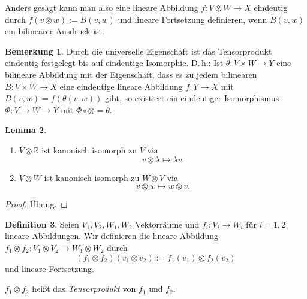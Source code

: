 \documentclass[a4paper]{scrreprt}
\numberwithin{equation}{chapter}
\newcommand{\R}{\mathbb{R}}
\theoremstyle{definition}
\newtheorem{defn}{Definition}[section]
\newtheorem{lemma}[defn]{Lemma}
\newtheorem{bem}[defn]{Bemerkung}
\newcommand{\bewUeb}{\begin{proof}Übung.\end{proof}}
\begin{document}
Anders gesagt kann man also eine lineare Abbildung $f\colon V\otimes W\to X$ eindeutig durch $f(v\otimes w) := B(v,w)$ und lineare Fortsetzung definieren, wenn $B(v,w)$ ein bilinearer Ausdruck ist.
\begin{bem}
	Durch die universelle Eigenschaft ist das Tensorprodukt eindeutig festgelegt bis auf eindeutige Isomorphie. D.\,h.: Ist $\theta\colon V\times W\to Y$ eine bilineare Abbildung mit der Eigenschaft, dass es zu jedem bilinearen $B\colon V\times W \to X$ eine eindeutige lineare Abbildung $f\colon Y\to X$ mit $B(v,w) = f(\theta(v,w))$ gibt, so existiert ein eindeutiger Isomorphismus $\Phi\colon V\to W\to Y$ mit $\Phi\circ\otimes = \theta$.
\end{bem}
\begin{lemma}
	\begin{enumerate}[label=(\alph*)]
		\item $V\otimes\R$ ist kanonisch isomorph zu $V$ via
		\[v\otimes\lambda \mapsto \lambda v.\]
		\item $V\otimes W$ ist kanonisch isomorph zu $W\otimes V$ via
		\[v\otimes w \mapsto w\otimes v.\]
	\end{enumerate}
	\bewUeb
\end{lemma}

\begin{defn}
	Seien $V_1,V_2, W_1, W_2$ Vektorräume und $f_i\colon V_i \to W_i$ für $i=1,2$ lineare Abbildungen. Wir definieren die lineare Abbildung $f_1\otimes f_2 \colon V_1\otimes V_2 \to W_1\otimes W_2$ durch
	\[(f_1\otimes f_2)(v_1\otimes v_2) := f_1(v_1) \otimes f_2(v_2)\]
	und lineare Fortsetzung.

	$f_1\otimes f_2$ heißt das \emph{Tensorprodukt} von $f_1$ und $f_2$.
\end{defn}
\end{document}

